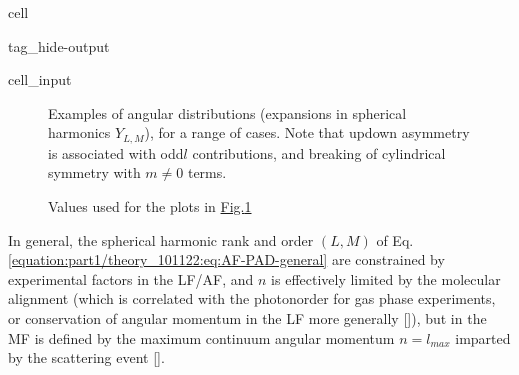 \documentclass[letterpaper,10pt,english]{jupyterBook}
\begin{document}
\begin{sphinxuseclass}{cell}
\begin{sphinxuseclass}{tag_hide-output}
\begin{sphinxVerbatimInput}
\begin{sphinxuseclass}{cell_input}
\begin{sphinxVerbatim}[commandchars=\\\{\}]

 \PYG{p}{[}\PYG{p}{]}   
\end{sphinxVerbatim}

\end{sphinxuseclass}\end{sphinxVerbatimInput}

\end{sphinxuseclass}
\end{sphinxuseclass}
\begin{figure}[htbp]
\centering
\capstart
\caption{Examples of angular distributions (expansions in spherical harmonics \(Y_{L,M}\)), for a range of cases. Note that up\sphinxhyphen{}down asymmetry is associated with odd\sphinxhyphen{}\(l\) contributions, and breaking of cylindrical symmetry with \(m\neq0\) terms.}\label{\detokenize{part1/theory_101122:fig-pads-example}}\end{figure}

\begin{figure}[htbp]
\centering
\capstart
\caption{Values used for the plots in \hyperref[\detokenize{part1/theory_101122:fig-pads-example}]{Fig.\@ \ref{\detokenize{part1/theory_101122:fig-pads-example}}}}\label{\detokenize{part1/theory_101122:blm-tab}}\end{figure}

\sphinxAtStartPar
In general, the spherical harmonic rank and order \((L,M)\) of Eq. \eqref{equation:part1/theory_101122:eq:AF-PAD-general} are constrained by experimental factors in the LF/AF, and \(n\) is effectively limited by the molecular alignment (which is correlated with the photon\sphinxhyphen{}order for gas phase experiments, or conservation of angular momentum in the LF more generally {[}{]}), but in the MF is defined by the maximum continuum angular momentum \(n=l_{max}\) imparted by the scattering event {[}{]}.
\end{document}
